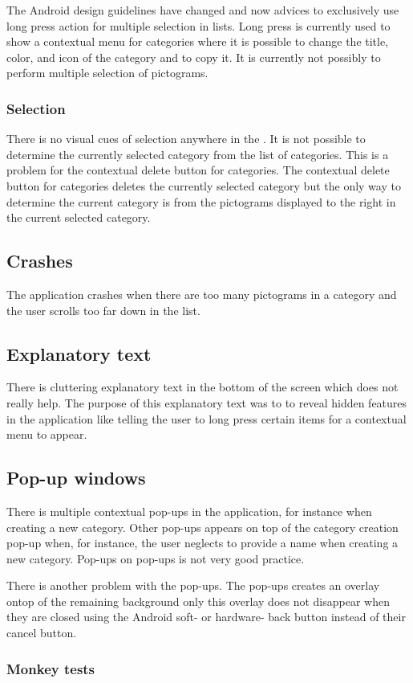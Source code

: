 The Android design guidelines have changed and now advices to exclusively use long press action for multiple selection in lists. Long press is currently used to show a contextual menu for categories where it is possible to change the title, color, and icon of the category and to copy it. It is currently not possibly to perform multiple selection of pictograms. 

\subsubsection{Selection}

There is no visual cues of selection anywhere in the \ct. It is not possible to determine the currently selected category from the list of categories. This is a problem for the contextual delete button for categories. The contextual delete button for categories deletes the currently selected category but the only way to determine the current category is from the pictograms displayed to the right in the current selected category. 

\subsection{Crashes}

The application crashes when there are too many pictograms in a category and the user scrolls too far down in the list. 

\subsection{Explanatory text}

There is cluttering explanatory text in the bottom of the screen which does not really help. The purpose of this explanatory text was to to reveal hidden features in the application like telling the user to long press certain items for a contextual menu to appear. 

\subsection{Pop-up windows}

There is multiple contextual pop-ups in the application, for instance when creating a new category. Other pop-ups appears on top of the category creation pop-up when, for instance, the user neglects to provide a name when creating a new category. Pop-ups on pop-ups is not very good practice.  

There is another problem with the pop-ups. The pop-ups creates an overlay ontop of the remaining background only this overlay does not disappear when they are closed using the Android soft- or hardware- back button instead of their cancel button. 
 
\subsubsection{Monkey tests}

